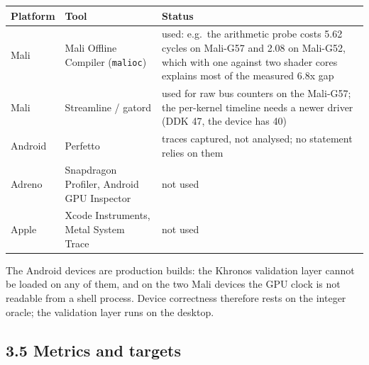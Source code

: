 \documentclass[
  10pt,
]{article}
\newcounter{none} %
\begin{document}
{\def\LTcaptype{none} %
\begin{longtable}[]{@{}
  >{\raggedright\arraybackslash}p{}
  >{\raggedright\arraybackslash}p{}
  >{\raggedright\arraybackslash}p{}@{}}
\toprule\noalign{}
\begin{minipage}[b]{\linewidth}\raggedright%
Platform
\end{minipage} & \begin{minipage}[b]{\linewidth}\raggedright%
Tool
\end{minipage} & \begin{minipage}[b]{\linewidth}\raggedright%
Status
\end{minipage} \\
\midrule\noalign{}
\endhead%
\bottomrule\noalign{}
\endlastfoot%
Mali & Mali Offline Compiler (\texttt{malioc}) & used: e.g.~the
arithmetic probe costs 5.62 cycles on Mali-G57 and 2.08 on Mali-G52,
which with one against two shader cores explains most of the measured
6.8x gap \\
Mali & Streamline / gatord & used for raw bus counters on the Mali-G57;
the per-kernel timeline needs a newer driver (DDK 47, the device has
40) \\
Android & Perfetto & traces captured, not analysed; no statement relies
on them \\
Adreno & Snapdragon Profiler, Android GPU Inspector & not used \\
Apple & Xcode Instruments, Metal System Trace & not used \\
\end{longtable}
}

The Android devices are production builds: the Khronos validation layer
cannot be loaded on any of them, and on the two Mali devices the GPU
clock is not readable from a shell process. Device correctness therefore
rests on the integer oracle; the validation layer runs on the desktop.

\subsection{3.5 Metrics and targets}\label{metrics-and-targets}
\end{document}
